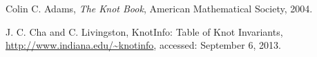 \documentclass[12pt,letterpaper]{article}
\theoremstyle{definition}
\begin{document}
\begin{thebibliography}{9}

	Colin C. Adams,
	\emph{The Knot Book},
	American Mathematical Society, 
	2004.	

	J. C. Cha and C. Livingston, 
	KnotInfo: Table of Knot Invariants, 
	\url{http://www.indiana.edu/~knotinfo}, 
	accessed: September 6, 2013.


\end{thebibliography}
\end{document}
